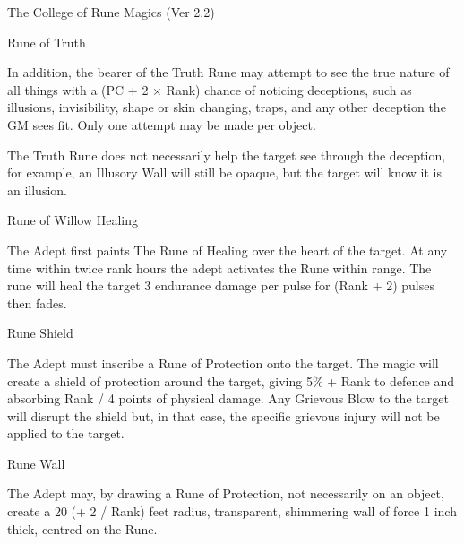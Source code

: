\begin{Chapter}{The College of Rune Magics (Ver 2.2)}
\begin{spell}[S-8]{Rune of Truth}
\begin{effects}
In addition, the bearer of the Truth Rune may attempt to see the true
nature of all things with a (PC + 2 × Rank) chance of noticing
deceptions, such as illusions, invisibility, shape or skin changing,
traps, and any other deception the GM sees fit.  Only one attempt may
be made per object.

The Truth Rune does not necessarily help the target see through the
deception, for example, an Illusory Wall will still be opaque, but the
target will know it is an illusion.
\end{effects}
\end{spell}

\begin{spell}[S-9]{Rune of Willow Healing}

\begin{effects}
The Adept first paints The Rune of Healing over the heart of the
target. At any time within twice rank hours the adept activates the
Rune within range. The rune will heal the target 3 endurance damage
per pulse for (Rank + 2) pulses then fades.
\end{effects}
\end{spell}

\begin{spell}[S-10]{Rune Shield}

\begin{effects}
The Adept must inscribe a Rune of Protection onto the target.  The
magic will create a shield of protection around the target, giving 5\%
+ Rank to defence and absorbing Rank / 4 points of physical damage.
Any Grievous Blow to the target will disrupt the shield but, in that
case, the specific grievous injury will not be applied to the target.
\end{effects}
\end{spell}

\begin{spell}[S-11]{Rune Wall}

\begin{effects}
The Adept may, by drawing a Rune of Protection, not necessarily on an
object, create a 20 (+ 2 / Rank) feet radius, transparent, shimmering
wall of force 1 inch thick, centred on the Rune.


\end{effects}
\end{spell}
\end{Chapter}
